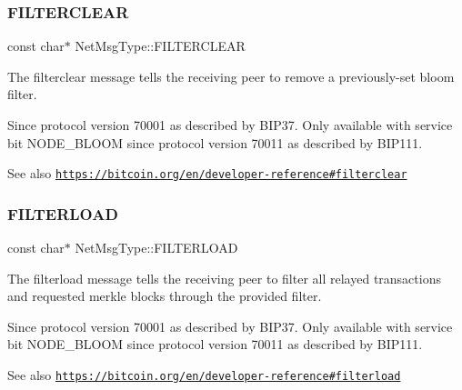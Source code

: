 \subsubsection{\texorpdfstring{F\+I\+L\+T\+E\+R\+C\+L\+E\+AR}{FILTERCLEAR}}
{\footnotesize\ttfamily const char$\ast$ Net\+Msg\+Type\+::\+F\+I\+L\+T\+E\+R\+C\+L\+E\+AR}

The filterclear message tells the receiving peer to remove a previously-\/set bloom filter. \begin{DoxySince}{Since}
protocol version 70001 as described by B\+I\+P37. Only available with service bit N\+O\+D\+E\+\_\+\+B\+L\+O\+OM since protocol version 70011 as described by B\+I\+P111. 
\end{DoxySince}
\begin{DoxySeeAlso}{See also}
\href{https://bitcoin.org/en/developer-reference#filterclear}{\tt https\+://bitcoin.\+org/en/developer-\/reference\#filterclear} 
\end{DoxySeeAlso}
\mbox{\label{namespace_net_msg_type_ab6eeb510444f7d2344d4715ea710b2c4}} 
\subsubsection{\texorpdfstring{F\+I\+L\+T\+E\+R\+L\+O\+AD}{FILTERLOAD}}
{\footnotesize\ttfamily const char$\ast$ Net\+Msg\+Type\+::\+F\+I\+L\+T\+E\+R\+L\+O\+AD}

The filterload message tells the receiving peer to filter all relayed transactions and requested merkle blocks through the provided filter. \begin{DoxySince}{Since}
protocol version 70001 as described by B\+I\+P37. Only available with service bit N\+O\+D\+E\+\_\+\+B\+L\+O\+OM since protocol version 70011 as described by B\+I\+P111. 
\end{DoxySince}
\begin{DoxySeeAlso}{See also}
\href{https://bitcoin.org/en/developer-reference#filterload}{\tt https\+://bitcoin.\+org/en/developer-\/reference\#filterload} 
\end{DoxySeeAlso}
\mbox{\label{namespace_net_msg_type_aa2bb70b7c194c1759f81d76471966386}} 
